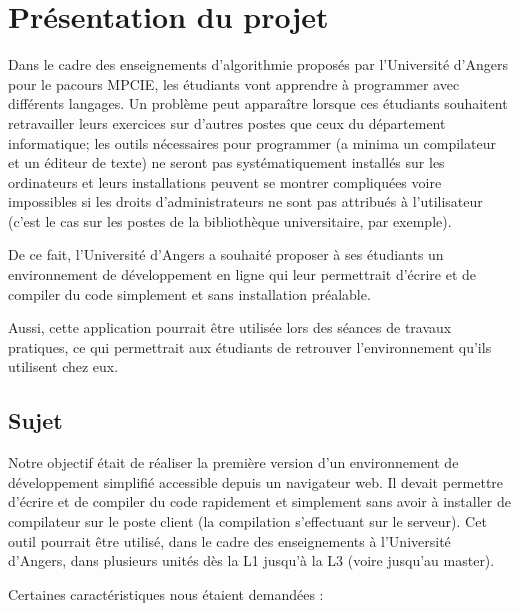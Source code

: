 \chapter{Présentation du projet}

\par Dans le cadre des enseignements d'algorithmie proposés par l'Université d'Angers pour le pacours MPCIE, les étudiants vont apprendre à programmer avec différents langages. Un problème peut apparaître lorsque ces étudiants souhaitent retravailler leurs exercices sur d'autres postes que ceux du département informatique; les outils nécessaires pour programmer (a minima un compilateur et un éditeur de texte) ne seront pas systématiquement installés sur les ordinateurs et leurs installations peuvent se montrer compliquées voire impossibles si les droits d'administrateurs ne sont pas attribués à l'utilisateur (c'est le cas sur les postes de la bibliothèque universitaire, par exemple).

\par De ce fait, l'Université d'Angers a souhaité proposer à ses étudiants un environnement de développement en ligne qui leur permettrait d'écrire et de compiler du code simplement et sans installation préalable.

\par Aussi, cette application pourrait être utilisée lors des séances de travaux pratiques, ce qui permettrait aux étudiants de retrouver l'environnement qu'ils utilisent chez eux.


\section{Sujet}

\par Notre objectif était de réaliser la première version d'un environnement de développement simplifié accessible depuis un navigateur web. Il devait permettre d'écrire et de compiler du code rapidement et simplement sans avoir à installer de compilateur sur le poste client (la compilation s'effectuant sur le serveur). Cet outil pourrait être utilisé, dans le cadre des enseignements à l'Université d'Angers, dans plusieurs unités dès la L1 jusqu'à la L3 (voire jusqu'au master). \\

\par Certaines caractéristiques nous étaient demandées :

